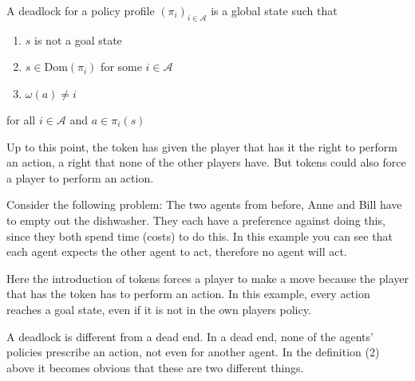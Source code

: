 \newpage






A deadlock for a policy profile $(\pi_i)_{i \in \mathcal{A}}$ is a global state such that
\begin{enumerate}
  \item $s$ is not a goal state
  \item $s \in \text{Dom}(\pi_i)$ for some $i \in \mathcal{A}$
  \item $\omega(a) \neq i$
\end{enumerate}
for all $i \in \mathcal{A}$ and $a \in \pi_i(s)$


Up to this point, the token has given the player that has it the right to perform an action, a right that none of the other players have. But tokens could also force a player to perform an action.

Consider the following problem: The two agents from before, Anne and Bill have to empty out the dishwasher. They each have a preference against doing this, since they both spend time (costs) to do this. 
In this example you can see that each agent expects the other agent to act, therefore no agent will act.

Here the introduction of tokens forces a player to make a move because the player that has the token has to perform an action. In this example, every action reaches a goal state, even if it is not in the own players policy.







A deadlock is different from a dead end. In a dead end, none of the agents' policies prescribe an action, not even for another agent. In the definition (2) above it becomes obvious that these are two different things.














































